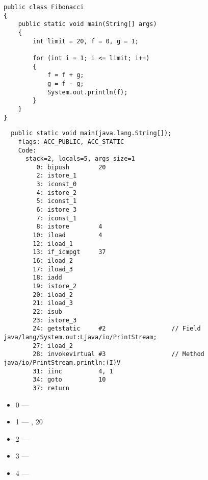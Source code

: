 


\begin{lstlisting}
public class Fibonacci
{
	public static void main(String[] args)
	{ 
		int limit = 20, f = 0, g = 1;

		for (int i = 1; i <= limit; i++)
		{
			f = f + g;
			g = f - g;
			System.out.println(f); 
		}
	}
}
\end{lstlisting}

\begin{lstlisting}
  public static void main(java.lang.String[]);
    flags: ACC_PUBLIC, ACC_STATIC
    Code:
      stack=2, locals=5, args_size=1
         0: bipush        20
         2: istore_1      
         3: iconst_0      
         4: istore_2      
         5: iconst_1      
         6: istore_3      
         7: iconst_1      
         8: istore        4
        10: iload         4
        12: iload_1       
        13: if_icmpgt     37
        16: iload_2       
        17: iload_3       
        18: iadd          
        19: istore_2      
        20: iload_2       
        21: iload_3       
        22: isub          
        23: istore_3      
        24: getstatic     #2                  // Field java/lang/System.out:Ljava/io/PrintStream;
        27: iload_2       
        28: invokevirtual #3                  // Method java/io/PrintStream.println:(I)V
        31: iinc          4, 1
        34: goto          10
        37: return        
\end{lstlisting}
        

\begin{itemize}
\item 0 --- 
\item 1 --- ,  20
\item 2 --- 
\item 3 --- 
\item 4 --- 
\end{itemize}

